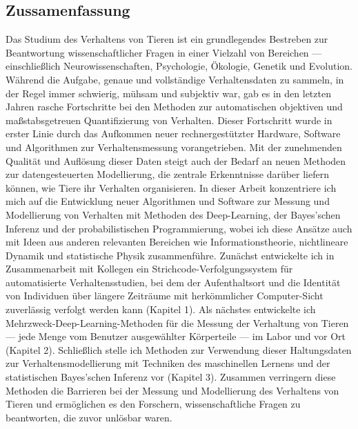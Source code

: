 \documentclass[11pt,a4paper,twoside]{book}
\begin{document}
\begin{doublespace}
	\chapter*{Zussamenfassung}
  Das Studium des Verhaltens von Tieren ist ein grundlegendes Bestreben zur Beantwortung wissenschaftlicher Fragen in einer Vielzahl von Bereichen --- einschließlich Neurowissenschaften, Psychologie, Ökologie, Genetik und Evolution. Während die Aufgabe, genaue und vollständige Verhaltensdaten zu sammeln, in der Regel immer schwierig, mühsam und subjektiv war, gab es in den letzten Jahren rasche Fortschritte bei den Methoden zur automatischen objektiven und maßstabsgetreuen Quantifizierung von Verhalten. Dieser Fortschritt wurde in erster Linie durch das Aufkommen neuer rechnergestützter Hardware, Software und Algorithmen zur Verhaltensmessung vorangetrieben. Mit der zunehmenden Qualität und Auflösung dieser Daten steigt auch der Bedarf an neuen Methoden zur datengesteuerten Modellierung, die zentrale Erkenntnisse darüber liefern können, wie Tiere ihr Verhalten organisieren. In dieser Arbeit konzentriere ich mich auf die Entwicklung neuer Algorithmen und Software zur Messung und Modellierung von Verhalten mit Methoden des Deep-Learning, der Bayes'schen Inferenz und der probabilistischen Programmierung, wobei ich diese Ansätze auch mit Ideen aus anderen relevanten Bereichen wie Informationstheorie, nichtlineare Dynamik und statistische Physik zusammenführe. Zunächst entwickelte ich in Zusammenarbeit mit Kollegen ein Strichcode-Verfolgungssystem für automatisierte Verhaltensstudien, bei dem der Aufenthaltsort und die Identität von Individuen über längere Zeiträume mit herkömmlicher Computer-Sicht zuverlässig verfolgt werden kann (Kapitel 1). Als nächstes entwickelte ich Mehrzweck-Deep-Learning-Methoden für die Messung der Verhaltung von Tieren --- jede Menge vom Benutzer ausgewählter Körperteile --- im Labor und vor Ort (Kapitel 2). Schließlich stelle ich Methoden zur Verwendung dieser Haltungsdaten zur Verhaltensmodellierung mit Techniken des maschinellen Lernens und der statistischen Bayes'schen Inferenz vor (Kapitel 3). Zusammen verringern diese Methoden die Barrieren bei der Messung und Modellierung des Verhaltens von Tieren und ermöglichen es den Forschern, wissenschaftliche Fragen zu beantworten, die zuvor unlösbar waren.

	\newpage

\end{doublespace}
\end{document}
